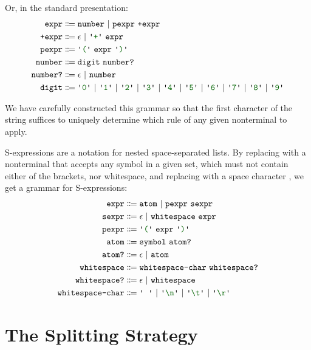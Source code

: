   
  Or, in the standard presentation:
  \begin{align*}
    \nt{expr} & \Coloneqq \nt{number}~|~\nt{pexpr}~\nt{+expr} \\
    \nt{+expr} & \Coloneqq \epsilon~|~\terminal{+}~\nt{expr} \\
    \nt{pexpr} & \Coloneqq \terminal{(}~\nt{expr}~\terminal{)} \\
    \nt{number} & \Coloneqq \nt{digit}~\nt{number?} \\
    \nt{number?} & \Coloneqq \epsilon~|~\nt{number} \\
    \nt{digit} & \Coloneqq \terminal{0}~|~\terminal{1}~|~\terminal{2}~|~\terminal{3}~|~\terminal{4}~|~\terminal{5}~|~\terminal{6}~|~\terminal{7}~|~\terminal{8}~|~\terminal{9}
  \end{align*}
  
  We have carefully constructed this grammar so that the first character of the string suffices to uniquely determine which rule of any given nonterminal to apply.
  
  S-expressions are a notation for nested space-separated lists.  By replacing  with a nonterminal that accepts any symbol in a given set, which must not contain either of the brackets, nor whitespace, and replacing \terminal{+} with a space character \terminal{\ }, we get a grammar for S-expressions:
  \begin{align*}
    \nt{expr} & \Coloneqq \nt{atom}~|~\nt{pexpr}~\nt{sexpr} \\
    \nt{sexpr} & \Coloneqq \epsilon~|~\nt{whitespace}~\nt{expr} \\
    \nt{pexpr} & \Coloneqq \terminal{(}~\nt{expr}~\terminal{)} \\
    \nt{atom} & \Coloneqq \nt{symbol}~\nt{atom?} \\
    \nt{atom?} & \Coloneqq \epsilon~|~\nt{atom} \\
    \nt{whitespace} & \Coloneqq \nt{whitespace-char}~\nt{whitespace?} \\
    \nt{whitespace?} & \Coloneqq \epsilon~|~\nt{whitespace} \\
    \nt{whitespace-char} & \Coloneqq \terminal{\ }~|~\terminal{\textbackslash n}~|~\terminal{\textbackslash t}~|~\terminal{\textbackslash r}
  \end{align*}
  
\section{The Splitting Strategy}
